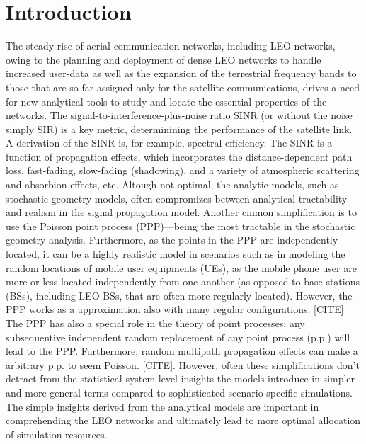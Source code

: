 \documentclass[lettersize,journal]{IEEEtran}
\begin{document}
\begin{IEEEkeywords}
  
\end{IEEEkeywords}


\section{Introduction}
The steady rise of aerial communication networks, including LEO networks, owing to the planning and deployment of dense LEO networks to handle increased user-data as well as the expansion of the terrestrial frequency bands to those that are so far assigned only for the satellite communications, drives a need for new analytical tools to study and locate the essential properties of the networks. The signal-to-interference-plus-noise ratio SINR (or without the noise simply SIR) is a key metric, determinining the performance of the satellite link. A derivation of the SINR is, for example, spectral efficiency. The SINR is a function of propagation effects, which incorporates the distance-dependent path loss, fast-fading, slow-fading (shadowing), and a variety of atmospheric scattering and absorbion effects, etc. Altough not optimal, the analytic models, such as stochastic geometry models, often compromizes between analytical tractability and realism in the signal propagation model. Another cmmon simplification is to use the Poisson point process (PPP)---being the most tractable in the stochastic geometry analysis. Furthermore, as the points in the PPP are independently located, it can be a highly realistic model in scenarios such as in modeling the random locations of mobile user equipments (UEs), as the mobile phone user are more or less located independently from one another (as opposed to base stations (BSs), including LEO BSs, that are often more regularly located). However, the PPP works as a approximation also with many regular configurations. [CITE] The PPP has also a special role in the theory of point processes: any subsequentive independent random replacement of any point process (p.p.) will lead to the PPP. Furthermore, random multipath propagation effects can make a arbitrary p.p. to seem Poisson. [CITE]. However, often these simplifications don't detract from the statistical system-level insights the models introduce in simpler and more general terms compared to sophisticated scenario-specific simulations. The simple insights derived from the analytical models are important in comprehending the LEO networks and ultimately lead to more optimal allocation of simulation resources.
\end{document}
